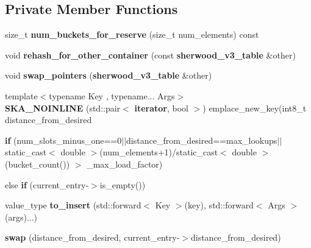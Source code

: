 \subsection*{Private Member Functions}
\begin{DoxyCompactItemize}
\item 
size\+\_\+t {\bfseries num\+\_\+buckets\+\_\+for\+\_\+reserve} (size\+\_\+t num\+\_\+elements) const \label{classska_1_1detailv3_1_1sherwood__v3__table_a227f0bd044907bd39408a98928cf055a}

\item 
void {\bfseries rehash\+\_\+for\+\_\+other\+\_\+container} (const {\bf sherwood\+\_\+v3\+\_\+table} \&other)\label{classska_1_1detailv3_1_1sherwood__v3__table_ab743f94bcf0887332f64489c93b10420}

\item 
void {\bfseries swap\+\_\+pointers} ({\bf sherwood\+\_\+v3\+\_\+table} \&other)\label{classska_1_1detailv3_1_1sherwood__v3__table_a2304a8c084c7649ad6a56f57dd509bc8}

\item 
{\footnotesize template$<$typename Key , typename... Args$>$ }\\{\bfseries S\+K\+A\+\_\+\+N\+O\+I\+N\+L\+I\+NE} (std\+::pair$<$ {\bf iterator}, bool $>$) emplace\+\_\+new\+\_\+key(int8\+\_\+t distance\+\_\+from\+\_\+desired\label{classska_1_1detailv3_1_1sherwood__v3__table_ab834eb352e96c51e3c948284fe6db5e5}

\item 
{\bfseries if} (num\+\_\+slots\+\_\+minus\+\_\+one==0$\vert$$\vert$distance\+\_\+from\+\_\+desired==max\+\_\+lookups$\vert$$\vert$static\+\_\+cast$<$ double $>$(num\+\_\+elements+1)/static\+\_\+cast$<$ double $>$(bucket\+\_\+count()) $>$ \+\_\+max\+\_\+load\+\_\+factor)\label{classska_1_1detailv3_1_1sherwood__v3__table_a11a2fdb1a7b222ff2e3e568b6cb65fd6}

\item 
else {\bfseries if} (current\+\_\+entry-\/$>$is\+\_\+empty())\label{classska_1_1detailv3_1_1sherwood__v3__table_a6ae64d4164e3b374d0a45813b5602479}

\item 
value\+\_\+type {\bfseries to\+\_\+insert} (std\+::forward$<$ Key $>$(key), std\+::forward$<$ Args $>$(args)...)\label{classska_1_1detailv3_1_1sherwood__v3__table_a997dd4841a0c18af664c940807125175}

\item 
{\bfseries swap} (distance\+\_\+from\+\_\+desired, current\+\_\+entry-\/$>$distance\+\_\+from\+\_\+desired)\label{classska_1_1detailv3_1_1sherwood__v3__table_ac0c961acbfbb68270133a74cf0ebf101}


\end{DoxyCompactItemize}
